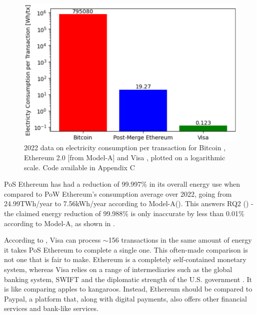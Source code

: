 \begin{figure}[!htb]
    \includegraphics[width=13cm,center]{Figures/ElectricityConsumptionPlot.png}
    \caption{2022 data on electricity consumption per transaction for Bitcoin \cite{BitcoinDigiconomist}, Ethereum 2.0 [from Model-A] and Visa \cite{2022VisaReport}, \cite{VisaHome} plotted on a logarithmic scale. Code available in Appendix C}
    \label{Figure:ElectricityConsumptionPlot}
\end{figure}

PoS Ethereum has had a reduction of 99.997\% in its overall energy use when compared to PoW Ethereum's consumption average over 2022, going from 24.99TWh/year to 7.56kWh/year according to Model-A(\cite{CCRIIndices}). This answers RQ2 () - the claimed energy reduction of 99.988\% is only inaccurate by less than 0.01\% according to Model-A, as shown in .

According to , Visa can process 
$\sim$156 transactions in the same amount of energy it takes PoS Ethereum to complete a single one. This often-made comparison is not one that is fair to make. Ethereum is a completely self-contained monetary system, whereas Visa relies on a range of intermediaries such as the global banking system, SWIFT and the diplomatic strength of the U.S. government \cite{Carter2021BitcoinComparison}. It is like comparing apples to kangaroos. Instead, Ethereum should be compared to Paypal, a platform that, along with digital payments, also offers other financial services and bank-like services.  

